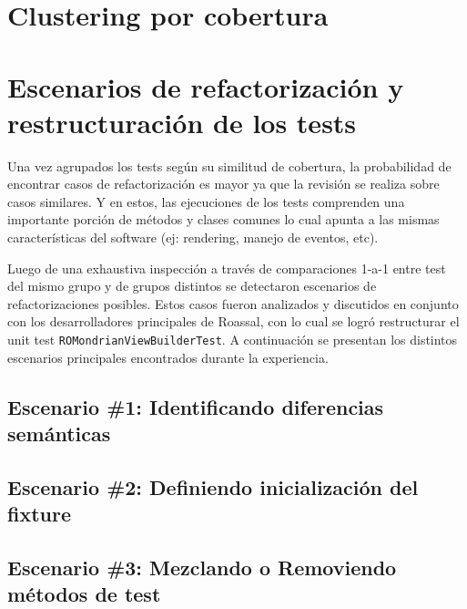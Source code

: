 \par 
{}

\section{Clustering por cobertura}

\par 

\section{Escenarios de refactorización y restructuración de los tests}

\par Una vez agrupados los tests según su similitud de cobertura, la probabilidad de encontrar casos de refactorización es mayor ya que la revisión se realiza sobre casos similares. Y en estos, las ejecuciones de los tests comprenden una importante porción de métodos y clases comunes lo cual apunta a las mismas características del software (ej: rendering, manejo de eventos, etc).

\par Luego de una exhaustiva inspección a través de comparaciones 1-a-1 entre test del mismo grupo y de grupos distintos se detectaron escenarios de refactorizaciones posibles. Estos casos fueron analizados y discutidos en conjunto con los desarrolladores principales de Roassal, con lo cual se logró restructurar el unit test {\tt ROMondrianViewBuilderTest}. A continuación se presentan los distintos escenarios principales encontrados durante la experiencia.

\subsection{Escenario \#1: Identificando diferencias semánticas}

\par 

\subsection{Escenario \#2: Definiendo inicialización del fixture}

\subsection{Escenario \#3: Mezclando o Removiendo métodos de test}

